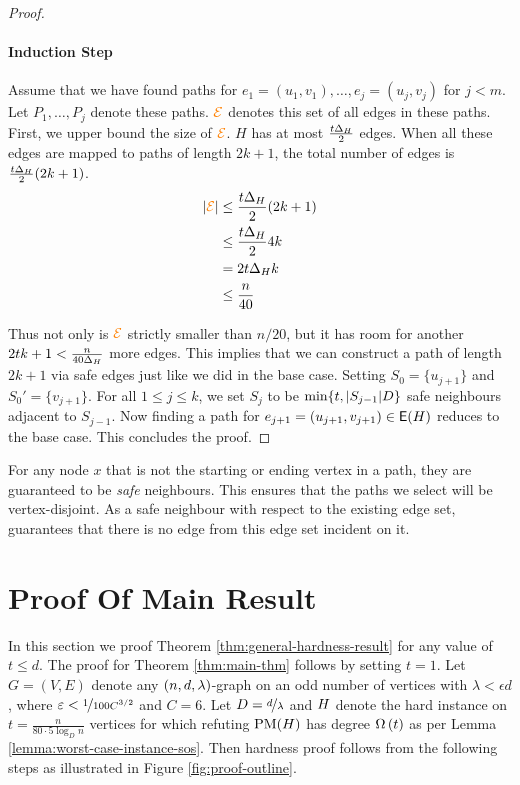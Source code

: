 \documentclass[11pt]{article}
\begin{document}
\begin{proof}
\paragraph{Induction Step}

Assume that we have found paths for $e_1 = (u_1, v_1), \dots, e_j=(u_j, v_j)$ for $j < m$.
Let $P_1, \dots, P_j$ denote these paths.
$\GlobalEdgeSet$ denotes this set of all edges in these paths.
First, we upper bound the size of $\GlobalEdgeSet$.
$H$ has at most $\frac{t\MaxDegree{H}}{2}$ edges.
When all these edges are mapped to paths of length $2k+1$, the total number of edges is $\frac{t\MaxDegree{H}}{2}(2k+1)$.
\begin{align*}
  \Size{\GlobalEdgeSet}  &\leq \frac{t\MaxDegree{H}}{2}(2k+1) \\
                         &\le \frac{t\MaxDegree{H}}{2}4k \\
                         &= 2t\MaxDegree{H}k \\
                         &\leq \frac{n}{40}
\end{align*}

Thus not only is $\GlobalEdgeSet$ strictly smaller than $n/20$, but it has room for another $2tk+1 < \frac{n}{40\MaxDegree{H}}$ more edges.
This implies that we can construct a path of length $2k+1$ via safe edges just like we did in the base case.
Setting $S_0 = \{ u_{j+1}\}$ and $S_0' = \{v_{j+1} \}$.
For all $1 \le j \le k$, we set $S_{j}$ to be $\min\{t, \Size{S_{j-1}}D \}$ safe neighbours adjacent to $S_{j-1}$.
Now finding a path for $e_{j+1} = (u_{j+1},v_{j+1}) \in \Edges{H}$ reduces to the base case.
This concludes the proof.

\end{proof}

\begin{remark}For any node $x$ that is not the starting or ending vertex in a path, they are guaranteed to be \emph{safe} neighbours.
  This ensures that the paths we select will be vertex-disjoint.
  As a safe neighbour with respect to the existing edge set, guarantees that there is no edge from this edge set incident on it.
\end{remark}


\section{Proof Of Main Result}
\label{sec:main-proof}

In this section we proof Theorem \ref{thm:general-hardness-result} for any value of $t \leq d$.
The proof for Theorem \ref{thm:main-thm} follows by setting $t=1$.
Let $G=(V,E)$ denote any $\EnDeeLambda$-graph on an odd number of vertices with $\lambda < \epsilon d$, where $\epsilon < \nicefrac{1}{100C^{3/2}}$ and $C=6$. Let $D=\nicefrac{d}{\lambda}$ and $\HardInstance$ denote the hard instance on $t=\frac{n}{80\cdot 5\log_D n}$ vertices for which refuting $\PM{H}$ has degree $\BigOmega{t}$ as per Lemma \ref{lemma:worst-case-instance-sos}.
Then hardness proof follows from the following steps as illustrated in Figure \ref{fig:proof-outline}.
\end{document}
